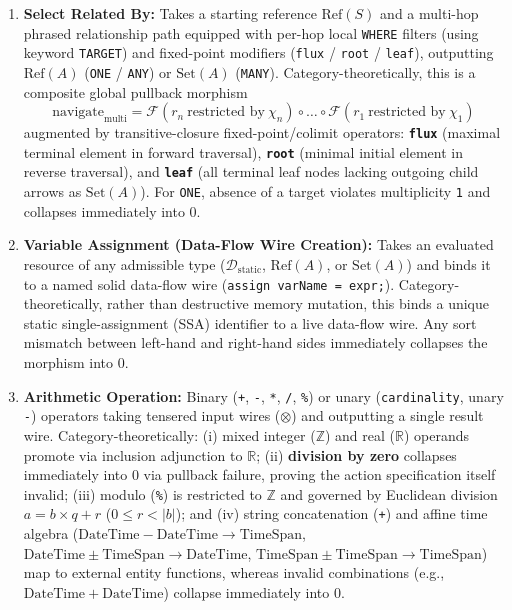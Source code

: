 \documentclass[11pt,a4paper]{article}
\theoremstyle{definition}
\theoremstyle{plain}
\theoremstyle{remark}
\newcommand{\Dstatic}{\mathcal{D}_{\mathrm{static}}}
\begin{document}
\begin{enumerate}[label=\textbf{(\arabic*)}, leftmargin=*]
    \item \textbf{Select Related By:}
    Takes a starting reference $\mathrm{Ref}(S)$ and a multi-hop phrased relationship path equipped with per-hop local \texttt{WHERE} filters (using keyword \texttt{TARGET}) and fixed-point modifiers (\texttt{flux} / \texttt{root} / \texttt{leaf}), outputting $\mathrm{Ref}(A)$ (\texttt{ONE} / \texttt{ANY}) or $\mathrm{Set}(A)$ (\texttt{MANY}).
    Category-theoretically, this is a composite global pullback morphism
    \begin{equation}
    \mathrm{navigate}_{\mathrm{multi}} = \mathcal{F}(r_n \ \text{restricted by} \ \chi_n) \circ \dots \circ \mathcal{F}(r_1 \ \text{restricted by} \ \chi_1)
    \end{equation}
    augmented by transitive-closure fixed-point/colimit operators: \textbf{\texttt{flux}} (maximal terminal element in forward traversal), \textbf{\texttt{root}} (minimal initial element in reverse traversal), and \textbf{\texttt{leaf}} (all terminal leaf nodes lacking outgoing child arrows as $\mathrm{Set}(A)$). For \texttt{ONE}, absence of a target violates multiplicity \texttt{1} and collapses immediately into $0$.

    \item \textbf{Variable Assignment (Data-Flow Wire Creation):}
    Takes an evaluated resource of any admissible type ($\Dstatic$, $\mathrm{Ref}(A)$, or $\mathrm{Set}(A)$) and binds it to a named solid data-flow wire (\texttt{assign varName = expr;}).
    Category-theoretically, rather than destructive memory mutation, this binds a unique static single-assignment (SSA) identifier to a live data-flow wire. Any sort mismatch between left-hand and right-hand sides immediately collapses the morphism into $0$.

    \item \textbf{Arithmetic Operation:}
    Binary (\texttt{+}, \texttt{-}, \texttt{*}, \texttt{/}, \texttt{\%}) or unary (\texttt{cardinality}, unary \texttt{-}) operators taking tensered input wires ($\otimes$) and outputting a single result wire.
    Category-theoretically: (i) mixed integer ($\mathbb{Z}$) and real ($\mathbb{R}$) operands promote via inclusion adjunction to $\mathbb{R}$; (ii) \textbf{division by zero} collapses immediately into $0$ via pullback failure, proving the action specification itself invalid; (iii) modulo (\texttt{\%}) is restricted to $\mathbb{Z}$ and governed by Euclidean division $a = b \times q + r$ ($0 \le r < \lvert b \rvert$); and (iv) string concatenation (\texttt{+}) and affine time algebra ($\mathrm{DateTime} - \mathrm{DateTime} \to \mathrm{TimeSpan}$, $\mathrm{DateTime} \pm \mathrm{TimeSpan} \to \mathrm{DateTime}$, $\mathrm{TimeSpan} \pm \mathrm{TimeSpan} \to \mathrm{TimeSpan}$) map to external entity functions, whereas invalid combinations (e.g., $\mathrm{DateTime} + \mathrm{DateTime}$) collapse immediately into $0$.


\end{enumerate}
\end{document}
